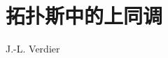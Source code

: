 \setcounter{chapter}{4}
\chapter{拓扑斯中的上同调}
\begin{center}
J.-L. Verdier
\end{center}
\label{sga4.exp.V}
\setcounter{pageoriginal}{1}

